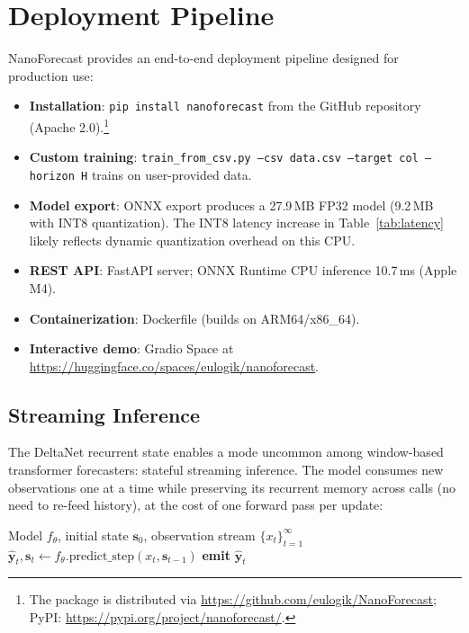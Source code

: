 \documentclass[11pt]{article}
\begin{document}
\section{Deployment Pipeline}
\label{sec:deployment}

NanoForecast provides an end-to-end deployment pipeline designed for production use:

\begin{itemize}
\item \textbf{Installation}: \texttt{pip install nanoforecast} from the GitHub repository (Apache 2.0).\footnote{The package is distributed via \url{https://github.com/eulogik/NanoForecast}; PyPI: \url{https://pypi.org/project/nanoforecast/}.}
\item \textbf{Custom training}: \texttt{train\_from\_csv.py --csv data.csv --target col --horizon H} trains on user-provided data.
\item \textbf{Model export}: ONNX export produces a 27.9\,MB FP32 model (9.2\,MB with INT8 quantization). The INT8 latency increase in Table~\ref{tab:latency} likely reflects dynamic quantization overhead on this CPU.
\item \textbf{REST API}: FastAPI server; ONNX Runtime CPU inference 10.7\,ms (Apple M4).
\item \textbf{Containerization}: Dockerfile (builds on ARM64/x86\_64).
\item \textbf{Interactive demo}: Gradio Space at \url{https://huggingface.co/spaces/eulogik/nanoforecast}.
\end{itemize}

\subsection{Streaming Inference}

The DeltaNet recurrent state enables a mode uncommon among window-based transformer forecasters: stateful streaming inference. The model consumes new observations one at a time while preserving its recurrent memory across calls (no need to re-feed history), at the cost of one forward pass per update:

\begin{algorithm}[h]
\caption{Streaming inference loop.}
\label{alg:streaming}
\begin{algorithmic}[1]
\Require Model $f_\theta$, initial state $\mathbf{s}_0$, observation stream $\{x_t\}_{t=1}^\infty$
    \State $\hat{\mathbf{y}}_t, \mathbf{s}_t \gets f_\theta.\text{predict\_step}(x_t, \mathbf{s}_{t-1})$
    \State \textbf{emit} $\hat{\mathbf{y}}_t$
\EndFor
\end{algorithmic}
\end{algorithm}
\end{document}
